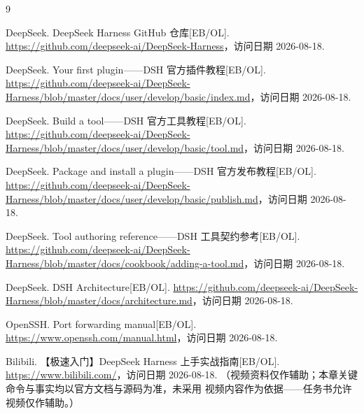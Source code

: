 \begin{thebibliography}{9}

DeepSeek. DeepSeek Harness GitHub 仓库[EB/OL].
\url{https://github.com/deepseek-ai/DeepSeek-Harness}，访问日期 2026-08-18.

DeepSeek. Your first plugin——DSH 官方插件教程[EB/OL].
\url{https://github.com/deepseek-ai/DeepSeek-Harness/blob/master/docs/user/develop/basic/index.md}，访问日期 2026-08-18.

DeepSeek. Build a tool——DSH 官方工具教程[EB/OL].
\url{https://github.com/deepseek-ai/DeepSeek-Harness/blob/master/docs/user/develop/basic/tool.md}，访问日期 2026-08-18.

DeepSeek. Package and install a plugin——DSH 官方发布教程[EB/OL].
\url{https://github.com/deepseek-ai/DeepSeek-Harness/blob/master/docs/user/develop/basic/publish.md}，访问日期 2026-08-18.

DeepSeek. Tool authoring reference——DSH 工具契约参考[EB/OL].
\url{https://github.com/deepseek-ai/DeepSeek-Harness/blob/master/docs/cookbook/adding-a-tool.md}，访问日期 2026-08-18.

DeepSeek. DSH Architecture[EB/OL].
\url{https://github.com/deepseek-ai/DeepSeek-Harness/blob/master/docs/architecture.md}，访问日期 2026-08-18.

OpenSSH. Port forwarding manual[EB/OL].
\url{https://www.openssh.com/manual.html}，访问日期 2026-08-18.

Bilibili. 【极速入门】DeepSeek Harness 上手实战指南[EB/OL].
\url{https://www.bilibili.com/}，访问日期 2026-08-18.
（视频资料仅作辅助；本章关键命令与事实均以官方文档与源码为准，未采用
视频内容作为依据——任务书允许视频仅作辅助。）

\end{thebibliography}
